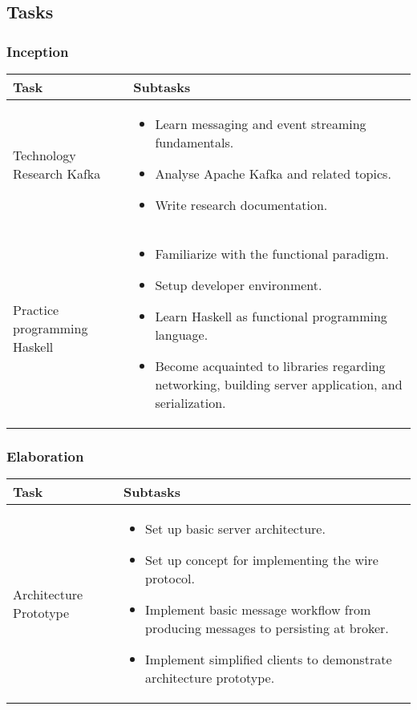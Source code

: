 \newpage
\subsection*{Tasks}
\label{subsec:tasks}
\subsubsection*{Inception}


\begin{tabular}[H]{|p{6cm}|p{7.5cm}|}\hline
    \textbf{Task} & \textbf{Subtasks} \\ \hline
    Technology Research Kafka & 
        \begin{itemize}
            \item Learn messaging and event streaming fundamentals.
            \item Analyse Apache Kafka and related topics. 
            \item Write research documentation.
        \end{itemize} \\ \hline
    Practice programming Haskell & 
        \begin{itemize}
            \item Familiarize with the functional paradigm.
            \item Setup developer environment.
            \item Learn Haskell as functional programming language.
            \item Become acquainted to libraries regarding networking,
              building server application, and serialization.
        \end{itemize} \\ \hline
\end{tabular}

\subsubsection*{Elaboration}
\begin{tabular}[H]{|p{6cm}|p{7.5cm}|}\hline
   \textbf{Task} & \textbf{Subtasks} \\ \hline
    Architecture Prototype &
        \begin{itemize}
            \item Set up basic server architecture.
            \item Set up concept for implementing the wire protocol.
            \item Implement basic message workflow from producing messages to
            persisting at broker.
            \item Implement simplified clients to demonstrate architecture
                prototype.
        \end{itemize} \\ \hline
   \end{tabular}

